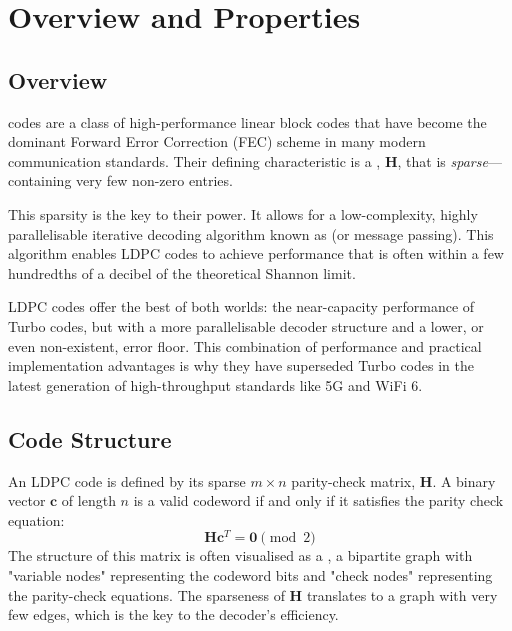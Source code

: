 \section{Overview and Properties}

\subsection{Overview}

 codes are a class of high-performance linear block codes that have become the dominant Forward Error Correction (FEC) scheme in many modern communication standards. Their defining characteristic is a , $\mathbf{H}$, that is \emph{sparse}—containing very few non-zero entries.

This sparsity is the key to their power. It allows for a low-complexity, highly parallelisable iterative decoding algorithm known as  (or message passing). This algorithm enables LDPC codes to achieve performance that is often within a few hundredths of a decibel of the theoretical Shannon limit.

\begin{keyconcept}
    LDPC codes offer the best of both worlds: the near-capacity performance of Turbo codes, but with a more parallelisable decoder structure and a lower, or even non-existent, error floor. This combination of performance and practical implementation advantages is why they have superseded Turbo codes in the latest generation of high-throughput standards like 5G and WiFi 6.
\end{keyconcept}


\subsection{Code Structure}

An LDPC code is defined by its sparse $m \times n$ parity-check matrix, $\mathbf{H}$. A binary vector $\mathbf{c}$ of length $n$ is a valid codeword if and only if it satisfies the parity check equation:
\begin{equation}
    \mathbf{H}\mathbf{c}^T = \mathbf{0} \pmod 2
\end{equation}
The structure of this matrix is often visualised as a , a bipartite graph with "variable nodes" representing the codeword bits and "check nodes" representing the parity-check equations. The sparseness of $\mathbf{H}$ translates to a graph with very few edges, which is the key to the decoder's efficiency.


